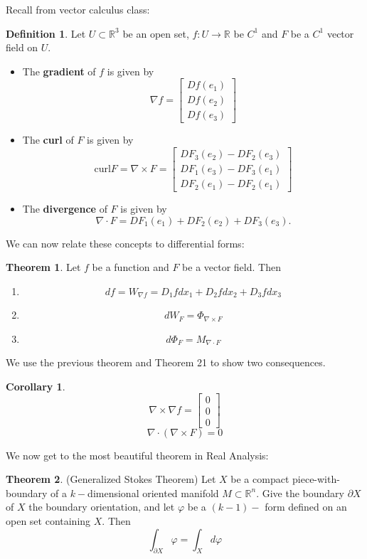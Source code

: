 \documentclass[10pt, oneside]{article}
\newcommand{\bbR}{\mathbb{R}}
\newcommand{\curl}{\text{curl}}
\theoremstyle{definition}
\newtheorem{thm}{Theorem}
\newtheorem{defn}{Definition}
\newtheorem{cor}{Corollary}
\begin{document}
Recall from vector calculus class:
\begin{defn}
    Let $U \subset \bbR^3$ be an open set, $f: U \to \bbR$ be $C^1$ and $F$ be a $C^1$ vector field on $U.$ 
    \begin{itemize}
        \item The \textbf{gradient} of $f$ is given by 
        \[\nabla f = \begin{bmatrix}
            Df(e_1)\\ Df(e_2)\\ Df(e_3)
        \end{bmatrix}\]
        \item The \textbf{curl} of $F$ is given by 
        \[\curl F  = \nabla \times F = \begin{bmatrix}
            DF_3(e_2) - DF_2(e_3)\\
            DF_1(e_3) - DF_3(e_1)\\
            DF_2(e_1) - DF_2(e_1)
        \end{bmatrix}\]
        \item The \textbf{divergence} of $F$ is given by 
        \[\nabla \cdot F = DF_1(e_1) + DF_2(e_2) + DF_3(e_3).\]
    \end{itemize}
\end{defn}

We can now relate these concepts to differential forms:
\begin{thm}
    Let $f$ be a function and $F$ be a vector field. Then
    \begin{enumerate}
        \item \[df = W_{\nabla f} = D_1f dx_1  + D_2fdx_2 + D_3f dx_3\]
        \item \[dW_F = \Phi_{\nabla \times F}\]
        \item \[d\Phi_F = M_{\nabla \cdot F}\]
    \end{enumerate}
\end{thm}

We use the previous theorem and Theorem 21 to show two consequences.
\begin{cor}
    \[\nabla \times \nabla f = \begin{bmatrix}
        0\\0\\0
    \end{bmatrix}\]
    \[\nabla \cdot (\nabla \times F) = 0\]
\end{cor}

We now get to the most beautiful theorem in Real Analysis:
\begin{thm}
    (Generalized Stokes Theorem) Let $X$ be a compact piece-with-boundary of a $k-$dimensional oriented manifold $M\subset \bbR^n.$ Give the boundary $\partial X$ of $X$ the boundary orientation, and let $\varphi$ be a $(k-1)-$ form defined on an open set containing $X.$ Then 
    \[\int_{\partial X} \varphi = \int_X d\varphi\]
\end{thm}
\end{document}
